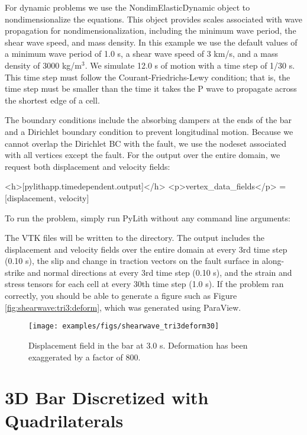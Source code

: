 For dynamic problems we use the NondimElasticDynamic object to
nondimensionalize the equations. This object provides scales
associated with wave propagation for nondimensionalization, including
the minimum wave period, the shear wave speed, and mass density. In
this example we use the default values of a minimum wave period of 1.0
s, a shear wave speed of 3 km/s, and a mass density of 3000
kg/m$^{3}$. We simulate 12.0 s of motion with a time step of 1/30
s. This time step must follow the Courant-Friedrichs-Lewy condition;
that is, the time step must be smaller than the time it takes the P
wave to propagate across the shortest edge of a cell.

The boundary conditions include the absorbing dampers at the ends of
the bar and a Dirichlet boundary condition to prevent longitudinal
motion. Because we cannot overlap the Dirichlet BC with the fault, we
use the nodeset associated with all vertices except the fault.  For
the output over the entire domain, we request both displacement and
velocity fields:
\begin{cfg}
<h>[pylithapp.timedependent.output]</h>
<p>vertex_data_fields</p> = [displacement, velocity]
\end{cfg}
To run the problem, simply run PyLith without any command line arguments:
The VTK files will be written to the  directory. The
output includes the displacement and velocity fields over the entire
domain at every 3rd time step (0.10 s), the slip and change in traction
vectors on the fault surface in along-strike and normal directions
at every 3rd time step (0.10 s), and the strain and stress tensors
for each cell at every 30th time step (1.0 s). If the problem ran
correctly, you should be able to generate a figure such as Figure
\vref{fig:shearwave:tri3:deform}, which was generated using ParaView.

\begin{figure}
  \texttt{[image: examples/figs/shearwave\_tri3deform30]}
  \caption{Displacement field in the bar at 3.0 s. Deformation has been exaggerated
    by a factor of 800.}
  \label{fig:shearwave:tri3:deform}
\end{figure}


\section{3D Bar Discretized with Quadrilaterals}
\label{sec:example:shearwave:quad4}

